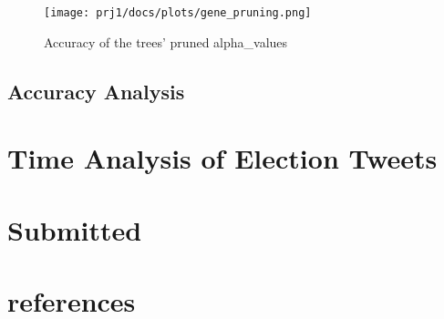 \documentclass{article}
\begin{document}
\begin{figure}[h!]
    \centering
    \texttt{[image: prj1/docs/plots/gene\_pruning.png]}
    \caption*{Accuracy of the trees' pruned alpha_values}
\end{figure}    

\subsection{Accuracy Analysis}

\section{Time Analysis of Election Tweets}

\section*{Submitted}

\section{references}
\end{document}
